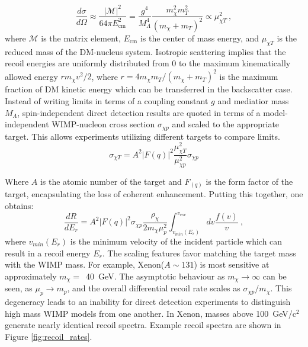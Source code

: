  \begin{equation}
     \frac{ d\sigma}{d \Omega} \approx \frac{|\mathcal{M}|^2}{64 \pi E_{\mathrm{cm}}^2} = \frac{g^4}{M_\Lambda^4} \frac{m_\chi^2 m_T^2}{(m_\chi+m_T)^2}  \propto \mu_{\chi T}^2~,
 \end{equation}
 \noindent
 where $\mathcal{M}$ is the matrix element, $E_{\mathrm{cm}}$ is the center of mass energy, and $\mu_{\chi T}$ is the reduced mass of the DM-nucleus system.
 Isotropic scattering implies that the recoil energies are uniformly distributed from 0 to the maximum kinematically allowed energy $rm_\chi v^2/2$, where $r = 4 m_\chi m_T /(m_\chi + m_T)^2$ is the maximum fraction of DM kinetic energy which can be transferred in the backscatter case.
 Instead of writing limits in terms of a coupling constant $g$ and mediatior mass $M_\Lambda$, spin-independent direct detection results are quoted in terms of a model-independent WIMP-nucleon cross section $\sigma_{\chi p}$ and scaled to the appropriate target.
 This allows experiments utilizing different targets to compare limits.
 \begin{equation}
     \sigma_{\chi T} = A^2 |F(q)|^2  \frac{\mu_{\chi T}^2}{\mu_{\chi p}^2}\sigma_{\chi p}
 \end{equation}
 
 Where $A$ is the atomic number of the target and $F_(q)$ is the form factor of the target, encapsulating the loss of coherent enhancement.
 Putting this together, one obtains:
  \begin{equation}
     \frac{dR}{dE_r} = A^2 |F(q)|^2 \sigma_{\chi p} \frac{\rho_\chi}{2m_\chi \mu_p^2} \int_{v_{min}(E_r)}^{v_{esc}} dv \frac{f(v)}v~,
     \label{eq:wimpscattering}
 \end{equation}
 \noindent
 where $v_{min}(E_r)$ is the minimum velocity of the incident particle which can result in a recoil energy $E_r$.
 The scaling features favor matching the target mass with the WIMP mass.
 For example, Xenon($A \sim 131$) is most sensitive at approximately $m_\chi=$~40~GeV.
 The asymptotic behaviour as $m_\chi \rightarrow \infty$ can be seen, as $\mu_p\rightarrow m_p$, and the overall differential recoil rate  scales as $\sigma_{\chi p} / m_\chi$.
 This degeneracy leads to an inability for direct detection experiments to distinguish high mass WIMP models from one another. 
 In Xenon, masses above 100~GeV/c$^2$ generate nearly identical recoil spectra.
Example recoil spectra are shown in Figure \ref{fig:recoil_rates}.

